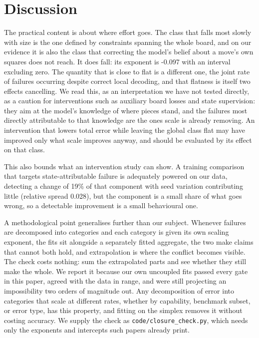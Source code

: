 \documentclass[11pt]{article}
\begin{document}
\section{Discussion}

The practical content is about where effort goes. The class that falls most slowly
with size is the one defined by constraints spanning the whole board, and on our
evidence it is also the class that correcting the model's belief about a move's own
squares does not reach. It does fall: its exponent is -0.097 with an interval
excluding zero. The quantity that is close to flat is a different one, the joint rate
of failures occurring despite correct local decoding, and that flatness is itself two
effects cancelling. We read this, as an interpretation we have not tested
directly, as a caution for interventions such as auxiliary board losses and state
supervision: they aim at the model's knowledge of where pieces stand, and the
failures most directly attributable to that knowledge are the ones scale is already
removing. An intervention that lowers total error while leaving the global class
flat may have improved only what scale improves anyway, and should be evaluated by
its effect on that class.

This also bounds what an intervention study can show. A training comparison that
targets state-attributable failure is adequately powered on our data, detecting a
change of 19\% of that component with seed variation contributing
little (relative spread 0.028), but the component is a small share of
what goes wrong, so a detectable improvement is a small behavioural one.

A methodological point generalises further than our subject. Whenever failures are
decomposed into categories and each category is given its own scaling exponent, the
fits sit alongside a separately fitted aggregate, the two make claims that cannot
both hold, and extrapolation is where the conflict becomes visible. The check costs nothing: sum the extrapolated parts and see whether they
still make the whole. We report it because our own uncoupled fits passed every gate
in this paper, agreed with the data in range, and were still projecting an
impossibility two orders of magnitude out. Any decomposition of error into
categories that scale at different rates, whether by capability, benchmark subset,
or error type, has this property, and fitting on the simplex removes it without
costing accuracy. We supply the check as \texttt{code/closure\_check.py}, which
needs only the exponents and intercepts such papers already print.
\end{document}
